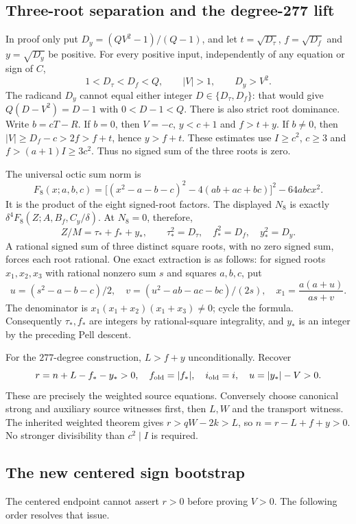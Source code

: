 \subsection{Three-root separation and the degree-277 lift}

In proof only put $D_y=(QV^2-1)/(Q-1)$, and let
$t=\sqrt{D_\tau}$, $f=\sqrt{D_f}$ and $y=\sqrt{D_y}$ be positive.
For every positive input, independently of any equation or sign of $C$,
\[
 1<D_\tau<D_f<Q,\qquad |V|>1,\qquad D_y>V^2.
\]
The radicand $D_y$ cannot equal either integer $D\in\{D_\tau,D_f\}$:
that would give $Q(D-V^2)=D-1$ with $0<D-1<Q$.
There is also strict root dominance.  Write $b=cT-R$.
If $b=0$, then $V=-c$, $y<c+1$ and $f>t+y$.
If $b\ne0$, then $|V|\ge D_f-c>2f>f+t$, hence $y>f+t$.
These estimates use $I\ge c^2$, $c\ge3$ and
$f>(a+1)I\ge3c^2$.  Thus no signed sum of the three roots is zero.

The universal octic sum norm is
\[
 F_8(x;a,b,c)=
 \bigl[(x^2-a-b-c)^2-4(ab+ac+bc)\bigr]^2-64abcx^2.
\]
It is the product of the eight signed-root factors.  The displayed
$N_8$ is exactly $\delta^4F_8(Z;A,B_f,C_y/\delta)$.
At $N_8=0$, therefore,
\[
 Z/M=\tau_*+f_*+y_*,\qquad
 \tau_*^2=D_\tau,\quad f_*^2=D_f,\quad y_*^2=D_y.
\]
A rational signed sum of three distinct square roots, with no zero
signed sum, forces each root rational.  One exact extraction is as follows:
for signed roots $x_1,x_2,x_3$ with rational nonzero sum $s$ and squares
$a,b,c$, put
\[
 u=(s^2-a-b-c)/2,\quad
 v=(u^2-ab-ac-bc)/(2s),\quad
 x_1=\frac{a(a+u)}{as+v}.
\]
The denominator is $x_1(x_1+x_2)(x_1+x_3)\ne0$; cycle the formula.
Consequently $\tau_*,f_*$ are integers by rational-square integrality,
and $y_*$ is an integer by the preceding Pell descent.

For the $277$-degree construction, $L>f+y$ unconditionally.  Recover
\[
 r=n+L-f_*-y_*>0,\quad f_{\rm old}=|f_*|,\quad
 i_{\rm old}=i,\quad u=|y_*|-V>0.
\]
These are precisely the weighted source equations.  Conversely choose
canonical strong and auxiliary source witnesses first, then $L,W$ and
the transport witness.  The inherited weighted theorem gives
$r>qW-2k>L$, so $n=r-L+f+y>0$.  No stronger divisibility than
$c^2\mid I$ is required.

\subsection{The new centered sign bootstrap}

The centered endpoint cannot assert $r>0$ before proving $V>0$.
The following order resolves that issue.

